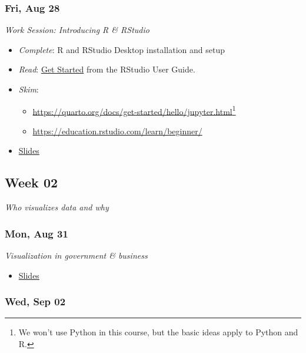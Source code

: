\documentclass[
  letterpaper,
  DIV=11,
  numbers=noendperiod]{scrartcl}
\providecommand{\tightlist}{%
  \setlength{\itemsep}{0pt}\setlength{\parskip}{0pt}}
\begin{document}
\subsubsection*{Fri, Aug 28}\label{fri-aug-28}

\emph{Work Session: Introducing R \& RStudio}

\begin{itemize}
\tightlist
\item
  \emph{Complete}: R and RStudio Desktop installation and setup
\item
  \emph{Read}:
  \href{https://docs.posit.co/ide/user/ide/get-started/}{Get Started}
  from the RStudio User Guide.
\item
  \emph{Skim}:

  \begin{itemize}
  \tightlist
  \item
    \url{https://quarto.org/docs/get-started/hello/jupyter.html}\footnote{We
      won't use Python in this course, but the basic ideas apply to
      Python and R.}
  \item
    \url{https://education.rstudio.com/learn/beginner/}
  \end{itemize}
\item
  \href{slides/wk-01-2026-08-28-introducing-r-rstudio.qmd}{Slides}
\end{itemize}

\subsection*{Week 02}\label{week-02}

\emph{Who visualizes data and why}

\subsubsection*{Mon, Aug 31}\label{mon-aug-31}

\emph{Visualization in government \& business}

\begin{itemize}
\tightlist
\item
  \href{slides/wk-02-2026-08-31-govt-biz.qmd}{Slides}
\end{itemize}

\subsubsection*{Wed, Sep 02}\label{wed-sep-02}
\end{document}
